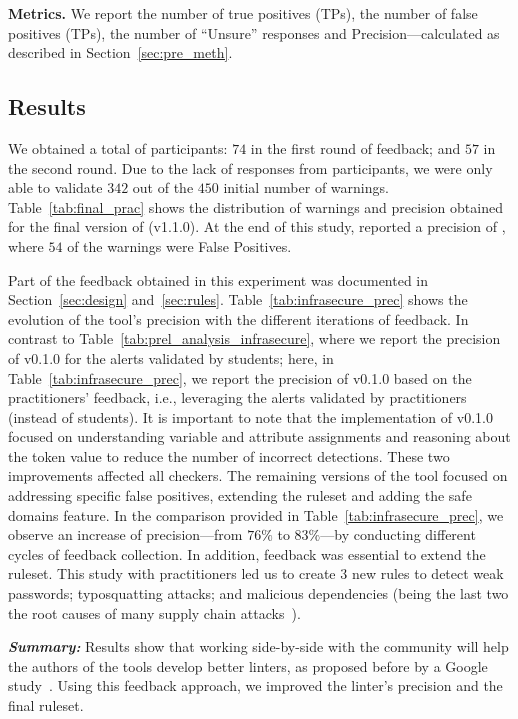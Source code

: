 \textbf{Metrics.} We report the number of true positives (TPs), 
the number of false positives (TPs), the number of ``Unsure'' 
responses and Precision---calculated as described in 
Section~\ref{sec:pre_meth}.

\subsection{Results}
We obtained a total of \noProfessionals{} participants: $74$ in 
the first round of feedback; and $57$ in the second 
round. Due to the lack of responses from participants, we 
were only able to validate $342$ out of the 
$450$ initial number of warnings.
Table~\ref{tab:final_prac} shows the distribution of warnings and 
precision obtained for the final version of \toolname{} (v1.1.0). 
At the end of this study, \toolname{} reported a precision of 
\finalPrecision{}, where $54$ of the warnings  
were False Positives. 

Part of the feedback obtained in this experiment
was documented in Section~\ref{sec:design} and~\ref{sec:rules}.
Table~\ref{tab:infrasecure_prec} shows the evolution 
of the tool's precision with the different iterations of feedback.
In contrast to Table~\ref{tab:prel_analysis_infrasecure}, where 
we report the precision of v0.1.0 for the alerts validated by students;
here, in Table~\ref{tab:infrasecure_prec}, we report the precision of v0.1.0
based on the practitioners' feedback, i.e., leveraging the alerts validated 
by practitioners (instead of students). It is important to 
note that the implementation of v0.1.0 focused on understanding 
variable and attribute assignments and reasoning about the token value  
to reduce the number of incorrect detections. These two improvements affected 
all checkers. The remaining versions of the tool focused on addressing specific 
false positives, extending the ruleset and adding the safe domains feature. 
In the comparison provided in Table~\ref{tab:infrasecure_prec}, we 
observe an increase of precision---from $76\%$
to $83\%$---by conducting different cycles of 
feedback collection.
In addition, feedback was essential to extend 
the ruleset. This study with practitioners led us 
to create $3$ new rules to detect weak passwords;
typosquatting attacks; and malicious dependencies (being 
the last two the root causes of many supply chain attacks~\cite{9402108,duan2020measuring}).

\textit{\textbf{Summary:}} Results show that working side-by-side with the community
will help the authors of the tools develop better linters, 
as proposed before by a Google study~\cite{46576}.
Using this feedback approach, we improved the linter's precision 
and the final ruleset.


